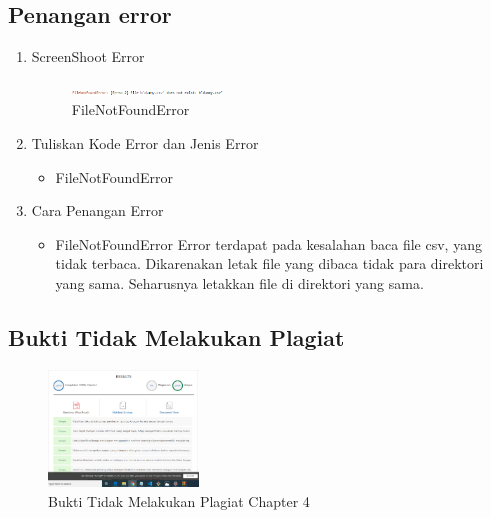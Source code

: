 \subsection{Penangan error}
\begin{enumerate}
	\item ScreenShoot Error
	\begin{figure}[H]
		\includegraphics[width=4cm]{figures/1174027/error/4_file_not_found.png}
		\centering
		\caption{FileNotFoundError}
	\end{figure}
	\item Tuliskan Kode Error dan Jenis Error
	\begin{itemize}
		\item FileNotFoundError
	\end{itemize}
	\item Cara Penangan Error
	\begin{itemize}
		\item FileNotFoundError
		\hfill\break
		Error terdapat pada kesalahan baca file csv, yang tidak terbaca. Dikarenakan letak file yang dibaca tidak para direktori yang sama. Seharusnya letakkan file di direktori yang sama. 
	\end{itemize}
\end{enumerate}
\subsection{Bukti Tidak Melakukan Plagiat}
\begin{figure}[H]
	\centering
		\includegraphics[width=4cm]{figures/1174027/bukti/4.png}
		\caption{Bukti Tidak Melakukan Plagiat Chapter 4}
	\end{figure}